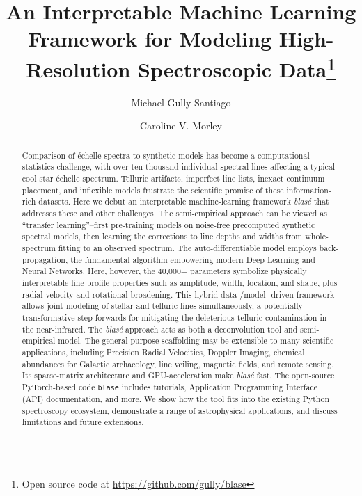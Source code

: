 \documentclass[trackchanges]{aastex631}
\begin{document}
\title{An Interpretable Machine Learning Framework for Modeling High-Resolution Spectroscopic Data\footnote{Open source code at \url{https://github.com/gully/blase}}}

\author{Michael Gully-Santiago}

\author{Caroline V. Morley}

\begin{abstract}

    Comparison of \'echelle spectra to synthetic models has become a computational statistics challenge, with over ten thousand individual spectral lines affecting a typical cool star \'echelle spectrum.  Telluric artifacts, imperfect line lists, inexact continuum placement, and inflexible models frustrate the scientific promise of these information-rich datasets.  Here we debut an interpretable machine-learning framework \emph{blas\'e} that addresses these and other challenges.  The semi-empirical approach can be viewed as ``transfer learning''--first pre-training models on noise-free precomputed synthetic spectral models, then learning the corrections to line depths and widths from whole-spectrum fitting to an observed spectrum.  The auto-differentiable model employs back-propagation, the fundamental algorithm empowering modern Deep Learning and Neural Networks. Here, however, the 40,000+ parameters symbolize physically interpretable line profile properties such as amplitude, width, location, and shape, plus radial velocity and rotational broadening.  This hybrid data-/model- driven framework allows joint modeling of stellar and telluric lines simultaneously, a potentially transformative step forwards for mitigating the deleterious telluric contamination in the near-infrared.  The \emph{blas\'e} approach acts as both a deconvolution tool and semi-empirical model. The general purpose scaffolding may be extensible to many scientific applications, including Precision Radial Velocities, Doppler Imaging, chemical abundances for Galactic archaeology, line veiling, magnetic fields, and remote sensing.  Its sparse-matrix architecture and GPU-acceleration make \emph{blas\'e} fast.  The open-source PyTorch-based code \texttt{blase} includes tutorials, Application Programming Interface (API) documentation, and more.  We show how the tool fits into the existing Python spectroscopy ecosystem, demonstrate a range of astrophysical applications, and discuss limitations and future extensions.


\end{abstract}
\end{document}
